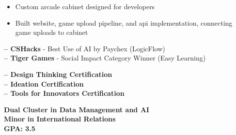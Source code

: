 \documentclass[10pt,a4paper,ragged2e,withhyper]{altacv}
\begin{document}
\begin{paracol}{2}
\divider

\begin{itemize}
    \item Custom arcade cabinet designed for developers
    \item Built website, game upload pipeline, and api implementation, connecting game uploads to cabinet
\end{itemize}\par



\textbf{ -- CSHacks} - Best Use of AI by Paychex (LogicFlow)\\
\textbf{ -- Tiger Games} - Social Impact Category Winner (Easy Learning)\\

\divider

\textbf{ -- Design Thinking Certification}\\
\textbf{ -- Ideation Certification}\\
\textbf{ -- Tools for Innovators Certification}

\switchcolumn


\textbf{Dual Cluster in Data Management and AI}\\
\textbf{Minor in International Relations}\\
\textbf{GPA: 3.5}\\

\medskip


\par\smallskip
{}
\par\smallskip
\divider

\par\smallskip
{}
\par\smallskip
{}
\par



\end{paracol}
\end{document}
